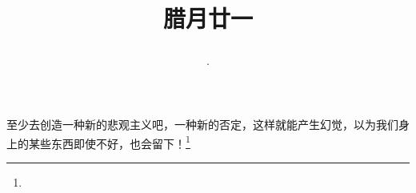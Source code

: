 \title{\date[d=31,m=1,y=2024][year:cn-y,年,month:cn,day:cn,日,·,weekday]·腊月廿一 }
至少去创造一种新的悲观主义吧，一种新的否定，这样就能产生幻觉，以为我们身上的某些东西即使不好，也会留下！\footnote{ }

